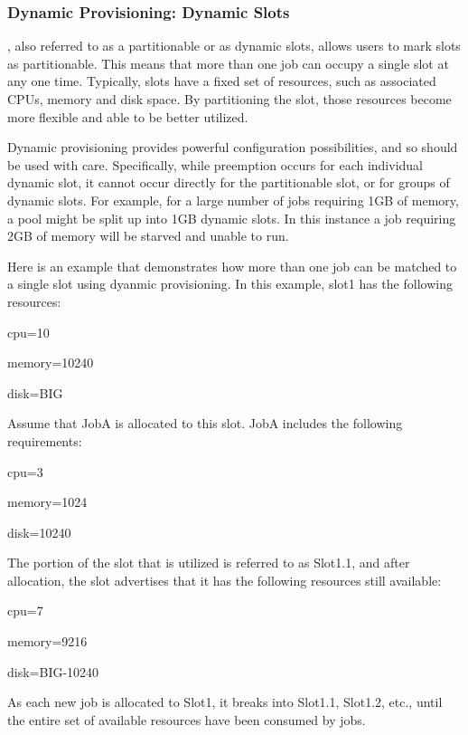 \subsubsection{\label{sec:SMP-dynamicprovisioning}
Dynamic  Provisioning: Dynamic Slots}

,
also referred to as a partitionable  or as dynamic slots,
allows users to mark slots as partitionable. 
This means that more than one job can occupy a single slot at any one time. 
Typically, slots have a fixed set of resources,
such as associated CPUs, memory and disk space. 
By partitioning the slot, 
those resources become more flexible and able to be better utilized.

Dynamic provisioning provides powerful configuration
possibilities, and so should be used with care. 
Specifically, while preemption occurs for each individual dynamic slot,
it cannot occur directly for the partitionable slot, 
or for groups of dynamic slots. 
For example, for a large number of jobs requiring 1GB of memory,
a pool might be split up into 1GB dynamic slots. 
In this instance a job requiring 2GB of memory will be starved
and unable to run.

Here is an example that demonstrates how more than one job
can be matched to a single slot using dyanmic provisioning.
In this example, slot1 has the following resources:
\begin{description}
  \item{cpu=10}
  \item{memory=10240}
  \item{disk=BIG}
\end{description}
Assume that JobA is allocated to this slot.
JobA includes the following requirements:
\begin{description}
  \item{cpu=3}
  \item{memory=1024}
  \item{disk=10240} 
\end{description}
The portion of the slot that is utilized is referred to as Slot1.1,
and after allocation, the slot advertises that it has
the following resources still available:
\begin{description}
  \item{cpu=7}
  \item{memory=9216}
  \item{disk=BIG-10240}
\end{description}
As each new job is allocated to Slot1,
it breaks into Slot1.1, Slot1.2, etc., until the entire set of
available resources have been consumed by jobs.

